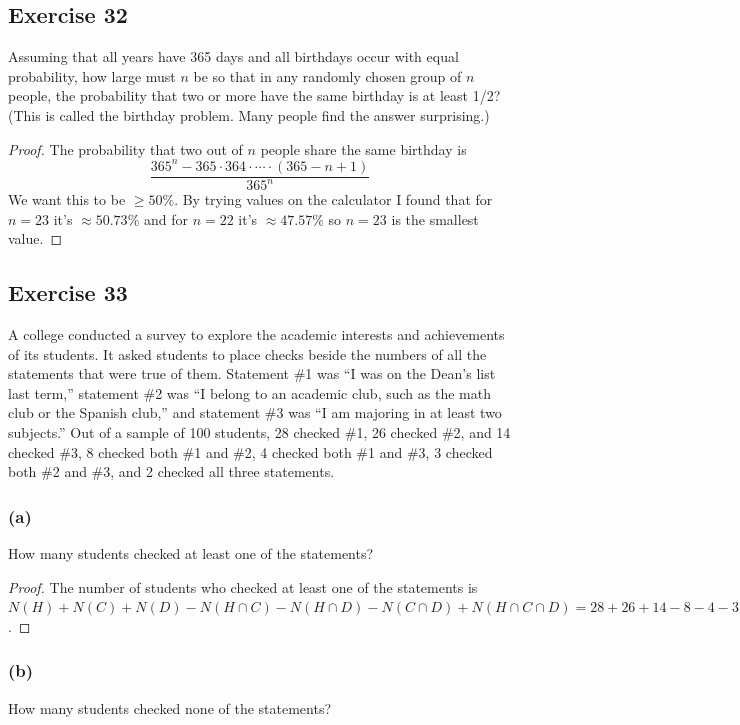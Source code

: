 \documentclass[14pt]{extarticle}
\begin{document}
\subsection{Exercise 32}
Assuming that all years have 365 days and all birthdays occur with equal probability, how large must $n$ be so that 
in any randomly chosen group of $n$ people, the probability that two or more have the same birthday is at least 1/2? 
(This is called the birthday problem. Many people find the answer surprising.)

\begin{proof}
The probability that two out of $n$ people share the same birthday is
\[
\frac{365^n - 365 \cdot 364 \cdot \cdots \cdot (365-n+1)}{365^n}
\]
We want this to be \(\geq 50\%\). By trying values on the calculator I found that for $n=23$ it's \(\approx 50.73\%\)
and for $n=22$ it's \(\approx 47.57\%\) so $n=23$ is the smallest value.
\end{proof}

\subsection{Exercise 33}
A college conducted a survey to explore the academic interests and achievements of its students. It asked 
students to place checks beside the numbers of all the statements that were true of them. Statement \#1 was “I was 
on the Dean’s list last term,” statement \#2 was “I belong to an academic club, such as the math club or the Spanish 
club,” and statement \#3 was “I am majoring in at least two subjects.” Out of a sample of 100 students, 28 checked \#1, 
26 checked \#2, and 14 checked \#3, 8 checked both \#1 and \#2, 4 checked both \#1 and \#3, 3 checked both \#2 and 
\#3, and 2 checked all three statements.

\subsubsection{(a)}
How many students checked at least one of the statements?

\begin{proof}
The number of students who checked at least one of the statements is \(N(H) + N(C) + N(D) - N(H \cap C) - 
N(H \cap D) - N(C \cap D) + N(H \cap C \cap D) = 28 + 26 + 14 - 8 - 4 - 3 + 2 = 55\).
\end{proof}

\subsubsection{(b)}
How many students checked none of the statements?
\end{document}

